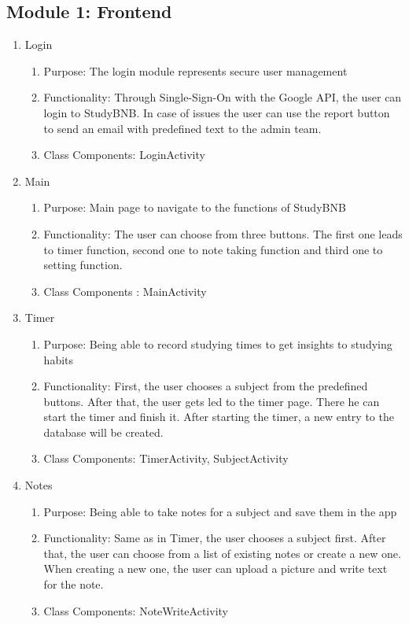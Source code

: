 \documentclass[conference]{IEEEtran}
\begin{document}
\subsection{Module 1: Frontend}

\begin{enumerate}
    \item Login
    \begin{enumerate}
        \item Purpose: The login module represents secure user management
        \item Functionality: Through Single-Sign-On with the Google API, the user can login to StudyBNB. In case of issues the user can use the report button to send an email with predefined text to the admin team.
        \item Class Components: LoginActivity
    \end{enumerate}
    
    \item Main
    \begin{enumerate}
        \item Purpose: Main page to navigate to the functions of StudyBNB
        \item Functionality: The user can choose from three buttons. The first one leads to timer function, second one to note taking function and third one to setting function.
        \item Class Components : MainActivity
    \end{enumerate}
    
    \item Timer
    \begin{enumerate}
        \item Purpose: Being able to record studying times to get insights to studying habits
        \item Functionality: First, the user chooses a subject from the predefined buttons. After that, the user gets led to the timer page. There he can start the timer and finish it. After starting the timer, a new entry to the database will be created.
        \item Class Components: TimerActivity, SubjectActivity
    \end{enumerate}
    
    \item Notes
    \begin{enumerate}
        \item Purpose: Being able to take notes for a subject and save them in the app
        \item Functionality: Same as in Timer, the user chooses a subject first. After that, the user can choose from a list of existing notes or create a new one. When creating a new one, the user can upload a picture and write text for the note.
        \item Class Components: NoteWriteActivity
    \end{enumerate}
    

\end{enumerate}
\end{document}
